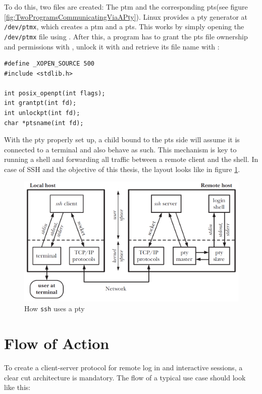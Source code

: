 \documentclass[10pt,a4paper,titlepage,twoside,english,final]{zhawreprt}
\begin{document}
To do this, two files are created: The \gls{ptm} and the corresponding \gls{pts}(see figure \ref{fig:TwoProgramsCommunicatingViaAPty}). \gls{Linux} provides a \gls{pty} generator at \texttt{/dev/ptmx}, which creates a \gls{ptm} and a \gls{pts}. This works by simply opening the \texttt{/dev/ptmx} file using \cite{posix_openpt}. After this, a program has to grant the \gls{pts} file ownership and permissions with \cite{grantpt}, unlock it with \cite{unlockpt} and retrieve its file name with \cite{ptsname}:
\setlistingC
\begin{lstlisting}[caption={\gls{pty} related \gls{Linux} \gls{API} functions},label=lst:PtyFunctions]
#define _XOPEN_SOURCE 500
#include <stdlib.h>

int posix_openpt(int flags);
int grantpt(int fd);
int unlockpt(int fd);
char *ptsname(int fd);
\end{lstlisting}

With the \gls{pty} properly set up, a child bound to the \gls{pts} side will assume it is connected to a \gls{terminal} and also behave as such. This mechanism is key to running a \gls{shell} and forwarding all traffic between a remote client and the \gls{shell}. In case of \gls{SSH} and the objective of this thesis, the layout looks like in figure \ref{fig:HowSSHUsesPty}.
\begin{figure}[ht]
\includegraphics[width=\textwidth]{PseudoterminalSSH}
\caption{How \texttt{ssh} uses a \gls{pty}\citep[p.1378]{KerriskTLPI}}
\label{fig:HowSSHUsesPty}
\end{figure}

\newpage
\section{Flow of Action}\label{sec:FlowOfAction}
To create a client-server protocol for remote log in and interactive sessions, a clear cut architecture is mandatory. The flow of a typical use case should look like this:
\end{document}
